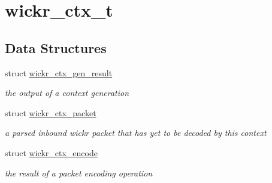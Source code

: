 \hypertarget{group__wickr__ctx}{}\section{wickr\+\_\+ctx\+\_\+t}
\label{group__wickr__ctx}
\subsection*{Data Structures}
\begin{DoxyCompactItemize}
\item 
struct \hyperlink{structwickr__ctx__gen__result}{wickr\+\_\+ctx\+\_\+gen\+\_\+result}
\begin{DoxyCompactList}\small\item\em the output of a context generation \end{DoxyCompactList}\item 
struct \hyperlink{structwickr__ctx__packet}{wickr\+\_\+ctx\+\_\+packet}
\begin{DoxyCompactList}\small\item\em a parsed inbound wickr packet that has yet to be decoded by this context \end{DoxyCompactList}\item 
struct \hyperlink{structwickr__ctx__encode}{wickr\+\_\+ctx\+\_\+encode}
\begin{DoxyCompactList}\small\item\em the result of a packet encoding operation \end{DoxyCompactList}\end{DoxyCompactItemize}

